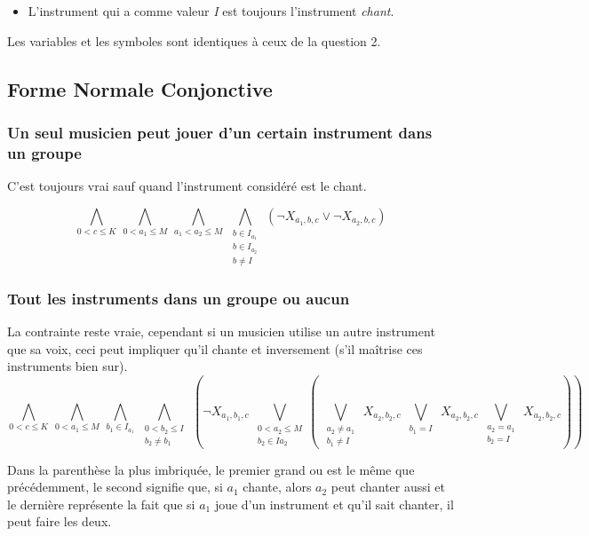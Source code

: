 \documentclass[11pt]{article}
\begin{document}
\begin{itemize}
\item L'instrument qui a comme valeur \textit{I} est toujours l'instrument \textsl{chant}.
\end{itemize}

Les variables et les symboles sont identiques à ceux de la question 2.

\subsection{Forme Normale Conjonctive}

\subsubsection{Un seul musicien peut jouer d'un certain instrument dans un groupe}

C'est toujours vrai sauf quand l'instrument considéré est le chant.

$$\bigwedge\limits_{0<c\le K}\ \bigwedge\limits_{0<a_1\le M}\ \bigwedge\limits_{a_1<a_2\le M}\ \bigwedge\limits_{\substack{b\in I_{a_1} \\ b\in I_{a_2} \\ b \ne I}}\ \left(\neg X_{a_1,b,c} \vee \neg X_{a_2,b,c}\right)$$

\subsubsection{Tout les instruments dans un groupe ou aucun}

La contrainte reste vraie, cependant si un musicien utilise un autre instrument que sa voix, ceci peut impliquer qu'il chante et inversement (s'il maîtrise ces instruments bien sur).\\

$$\bigwedge\limits_{0<c\le K}\ \bigwedge\limits_{0<a_1\le M}\ \bigwedge\limits_{b_1\in I_{a_1}}\ \bigwedge\limits_{\substack{0<b_2\le I \\ b_2 \ne b_1}}\ \left(\neg X_{a_1,b_1,c} \ \bigvee\limits_{\substack{0<a_2\le M \\ b_2 \in I{a_2}}}\left( \
\bigvee\limits_{\substack{a_2 \ne a_1 \\ b_1 \ne I}}\  X_{a_2,b_2,c}\ 
\bigvee\limits_{\substack{b_1 = I}}\ X_{a_2,b_2,c}\ 
\bigvee\limits_{\substack{a_2 = a_1 \\ b_2 = I}}\ X_{a_2,b_2,c}\right)\right)$$

Dans la parenthèse la plus imbriquée, le premier grand ou est le même que précédemment, le second signifie que, si $a_1$ chante, alors $a_2$ peut chanter aussi et le dernière représente la fait que si $a_1$ joue d'un instrument et qu'il sait chanter, il peut faire les deux.
\end{document}
